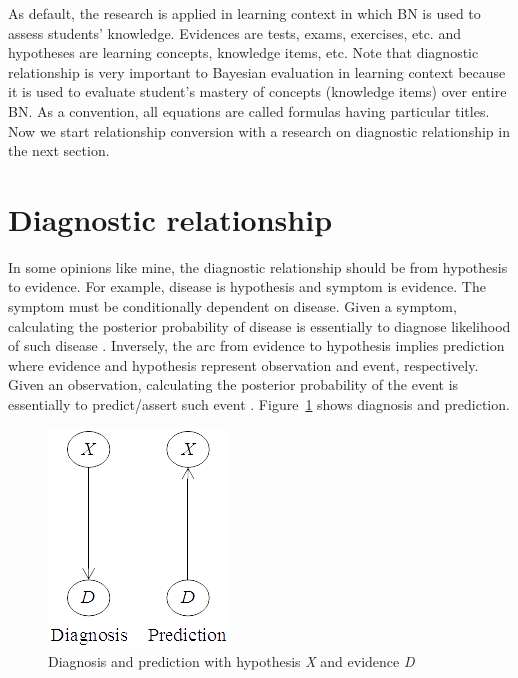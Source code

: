\documentclass{article}
\numberwithin{equation}{section}
\numberwithin{figure}{section}
\numberwithin{table}{section}
\begin{document}
As default, the research is applied in learning context in which BN is used to assess students' knowledge. Evidences are tests, exams, exercises, etc. and hypotheses are learning concepts, knowledge items, etc. Note that diagnostic relationship is very important to Bayesian evaluation in learning context because it is used to evaluate student's mastery of concepts (knowledge items) over entire BN. As a convention, all equations are called formulas having particular titles. Now we start relationship conversion with a research on diagnostic relationship in the next section.

\section{Diagnostic relationship}
In some opinions like mine, the diagnostic relationship should be from hypothesis to evidence. For example, disease is hypothesis and symptom is evidence. The symptom must be conditionally dependent on disease. Given a symptom, calculating the posterior probability of disease is essentially to diagnose likelihood of such disease \cite[p.~1666]{millan:bayesiannetwork}. Inversely, the arc from evidence to hypothesis implies prediction where evidence and hypothesis represent observation and event, respectively. Given an observation, calculating the posterior probability of the event is essentially to predict/assert such event \cite[p.~1666]{millan:bayesiannetwork}. Figure~\ref{figure:diagnosis-prediction} shows diagnosis and prediction.

\begin{figure}
\centering
\includegraphics{DiagnosisPrediction.png}
\caption{Diagnosis and prediction with hypothesis \textit{X} and evidence \textit{D}}
\label{figure:diagnosis-prediction}
\end{figure}
\end{document}
